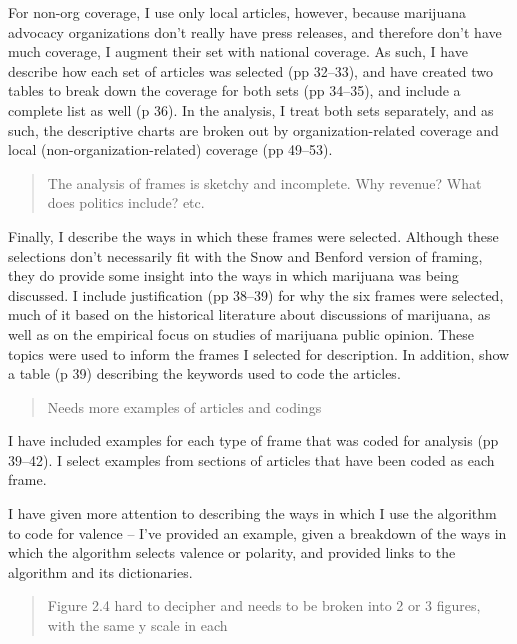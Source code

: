 \documentclass[12pt,stdletter,dateno,sigleft]{newlfm} %
\begin{document}
\begin{newlfm}
For non-org coverage, I use only local articles, however, because marijuana advocacy organizations don't really have press releases, and therefore don't have much coverage, I augment their set with national coverage. As such, I have describe how each set of articles was selected (pp 32--33), and have created two tables to break down the coverage for both sets (pp 34--35), and include a complete list as well (p 36). In the analysis, I treat both sets separately, and as such, the descriptive charts are broken out by organization-related coverage and local (non-organization-related) coverage (pp 49--53).



\begin{quotation}{\color{red}\noindent \footnotesize
The analysis of frames is sketchy and incomplete. Why revenue? What does politics include? etc.
}
\end{quotation}


Finally, I describe the ways in which these frames were selected. Although these selections don't necessarily fit with the Snow and Benford version of framing, they do provide some insight into the ways in which marijuana was being discussed. I include justification (pp 38--39) for why the six frames were selected, much of it based on the historical literature about discussions of marijuana, as well as on the empirical focus on studies of marijuana public opinion. These topics were used to inform the frames I selected for description. In addition, show a table (p 39) describing the keywords used to code the articles. 


\begin{quotation}{\color{red}\noindent \footnotesize
Needs more examples of articles and codings
}
\end{quotation}

I have included examples for each type of frame that was coded for analysis (pp 39--42). I select examples from sections of articles that have been coded as each frame. 

I have given more attention to describing the ways in which I use the algorithm to code for valence -- I've provided an example, given a breakdown of the ways in which the algorithm selects valence or polarity, and provided links to the algorithm and its dictionaries. 





\begin{quotation}{\color{red}\noindent \footnotesize
Figure 2.4 hard to decipher and needs to be broken into 2 or 3 figures, with the same y scale in each
}
\end{quotation}


\end{newlfm}
\end{document}
